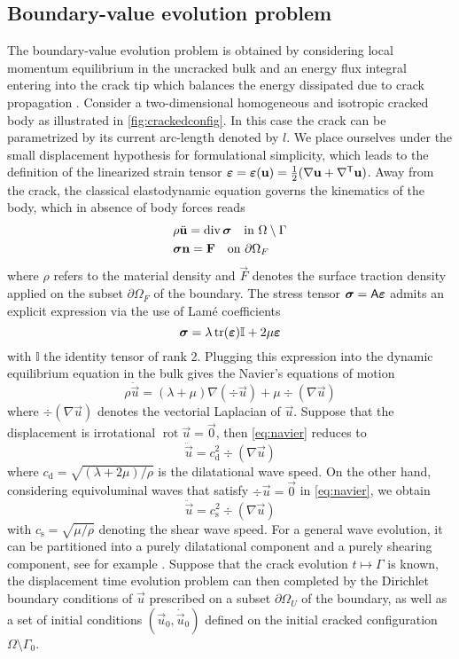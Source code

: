 \subsection{Boundary-value evolution problem}
The boundary-value evolution problem is obtained by considering local momentum equilibrium in the uncracked bulk and an energy flux integral entering into the crack tip which balances the energy dissipated due to crack propagation \cite{NakamuraShihFreund:1985,Cherepanov:1989}. Consider a two-dimensional homogeneous and isotropic cracked body as illustrated in \cref{fig:crackedconfig}. In this case the crack can be parametrized by its current arc-length denoted by $l$. We place ourselves under the small displacement hypothesis for formulational simplicity, which leads to the definition of the linearized strain tensor $\eps=\eps(\vec{u})=\frac{1}{2}(\nabla\vec{u}+\nabla^\mT\vec{u})$. Away from the crack, the classical elastodynamic equation governs the kinematics of the body, which in absence of body forces reads
\begin{equation} \label{eq:elastogriffith}
\begin{aligned}
& \rho\ddot{\vec{u}}=\div\sig\quad\text{in $\Omega\setminus\Gamma$} \\
& \sig\vec{n}=\vec{F}\quad\text{on $\partial\Omega_F$}
\end{aligned}
\end{equation}
where $\rho$ refers to the material density and $\vec{F}$ denotes the surface traction density applied on the subset $\partial\Omega_F$ of the boundary. The stress tensor $\sig=\tens{A}\eps$ admits an explicit expression via the use of Lamé coefficients
\[
\sig=\lambda\tr(\eps)\mathbb{I}+2\mu\eps
\]
with $\mathbb{I}$ the identity tensor of rank 2. Plugging this expression into the dynamic equilibrium equation in the bulk gives the Navier's equations of motion
\begin{equation} \label{eq:navier}
\rho\ddot{\vec{u}}=(\lambda+\mu)\nabla(\div\vec{u})+\mu\div(\nabla\vec{u})
\end{equation}
where $\div(\nabla\vec{u})$ denotes the vectorial Laplacian of $\vec{u}$. Suppose that the displacement is irrotational $\operatorname{rot}\vec{u}=\vec{0}$, then \eqref{eq:navier} reduces to
\[
\ddot{\vec{u}}=c_\mathrm{d}^2\div(\nabla\vec{u})
\]
where $c_\mathrm{d}=\sqrt{(\lambda+2\mu)/\rho}$ is the dilatational wave speed. On the other hand, considering equivoluminal waves that satisfy $\div\vec{u}=\vec{0}$ in \eqref{eq:navier}, we obtain
\[
\ddot{\vec{u}}=c_\mathrm{s}^2\div(\nabla\vec{u})
\]
with $c_\mathrm{s}=\sqrt{\mu/\rho}$ denoting the shear wave speed. For a general wave evolution, it can be partitioned into a purely dilatational component and a purely shearing component, see for example \cite{Sternberg:1960aa}. Suppose that the crack evolution $t\mapsto\Gamma$ is known, the displacement time evolution problem can then completed by the Dirichlet boundary conditions of $\vec{u}$ prescribed on a subset $\partial\Omega_U$ of the boundary, as well as a set of initial conditions $(\vec{u}_0,\dot{\vec{u}}_0)$ defined on the initial cracked configuration $\Omega\setminus\Gamma_0$.

